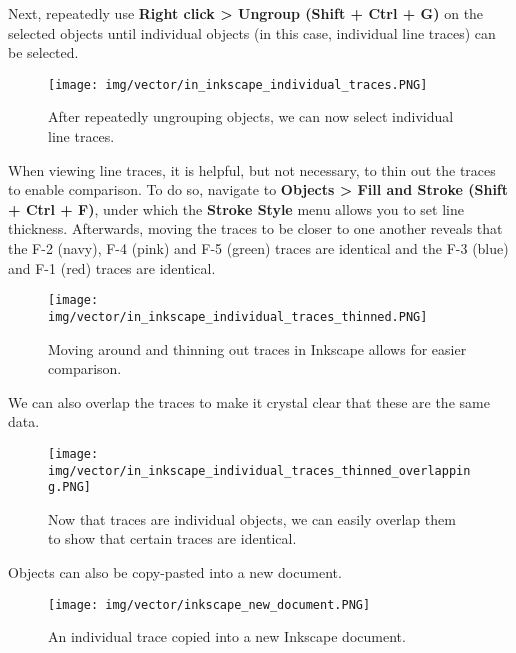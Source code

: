 \documentclass[letterpaper, 12pt]{article}
\begin{document}
\pagebreak
Next, repeatedly use \textbf{Right click > Ungroup (Shift + Ctrl + G)} on the selected objects until individual objects (in this case, individual line traces) can be selected.

\begin{figure}[h!tbp]
    \texttt{[image: img/vector/in\_inkscape\_individual\_traces.PNG]}
    \caption*{After repeatedly ungrouping objects, we can now select individual line traces.}
\end{figure}

\pagebreak
When viewing line traces, it is helpful, but not necessary, to thin out the traces to enable comparison. To do so, navigate to \textbf{Objects > Fill and Stroke (Shift + Ctrl + F)}, under which the \textbf{Stroke Style} menu allows you to set line thickness. Afterwards, moving the traces to be closer to one another reveals that the F-2 (navy), F-4 (pink) and F-5 (green) traces are identical and the F-3 (blue) and F-1 (red) traces are identical.

\begin{figure}[h!tbp]
    \texttt{[image: img/vector/in\_inkscape\_individual\_traces\_thinned.PNG]}
    \caption*{Moving around and thinning out traces in Inkscape allows for easier comparison.}
\end{figure}

\pagebreak
We can also overlap the traces to make it crystal clear that these are the same data.

\begin{figure}[h!tbp]
    \texttt{[image: img/vector/in\_inkscape\_individual\_traces\_thinned\_overlapping.PNG]}
    \caption*{Now that traces are individual objects, we can easily overlap them to show that certain traces are identical.}
\end{figure}

\pagebreak
Objects can also be copy-pasted into a new document.

\begin{figure}[h!tbp]
    \texttt{[image: img/vector/inkscape\_new\_document.PNG]}
    \caption*{ An individual trace copied into a new Inkscape document.}
\end{figure}
\end{document}
